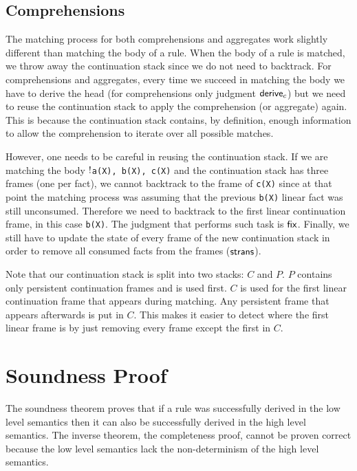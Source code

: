\subsection{Comprehensions}

The matching process for both comprehensions and aggregates work slightly different than matching the
body of a rule. When the body of a rule is matched, we throw away the continuation stack since we
do not need to backtrack. For comprehensions and aggregates, every time we succeed in matching the body
we have to derive the head (for comprehensions only judgment $\mathsf{derive}_c$) but we need to reuse the
continuation stack to
apply the comprehension (or aggregate) again. This is because the continuation stack contains,
by definition, enough information to allow the comprehension to iterate over all possible matches.

However, one needs to be careful in reusing the continuation stack. If we are matching the body
\texttt{${!}$a(X), b(X), c(X)} and the continuation stack has three frames (one per fact), we cannot
backtrack to the frame of \texttt{c(X)} since at that point the matching process was assuming that the previous
\texttt{b(X)} linear fact was still unconsumed. Therefore we need to backtrack to the first linear
continuation frame, in this case \texttt{b(X)}. The judgment that performs such task is $\mathsf{fix}$.
Finally, we still have to update the state of every frame
of the new continuation stack in order to remove all consumed facts from the frames ($\mathsf{strans}$).

Note that our continuation stack is split into two stacks: $C$ and $P$. $P$ contains only
persistent continuation frames and is used first. $C$ is used for the first linear continuation frame
that appears during matching. Any persistent frame that appears afterwards is put in $C$. This makes
it easier to detect where the first linear frame is by just removing every frame except the first in $C$.

\section{Soundness Proof}

The soundness theorem proves that if a rule was successfully derived in the low level semantics
then it can also be successfully derived in the high level semantics. The inverse theorem, the
completeness proof, cannot be proven correct because the low level semantics lack the non-determinism
of the high level semantics.

